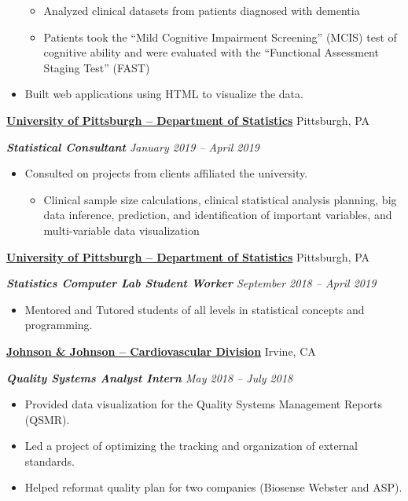 \documentclass[9pt,letterpaper]{article}
\begin{document}
\begin{description}[noitemsep]
\begin{itemize}[noitemsep]
\begin{itemize}
				\item Analyzed clinical datasets from patients diagnosed with dementia
				\item Patients took the ``Mild Cognitive Impairment Screening'' (MCIS) test of cognitive ability and were evaluated with the ``Functional Assessment Staging Test'' (FAST)
			\end{itemize}
			\item Built web applications using HTML to visualize the data.
		\end{itemize}
		\item \textbf{\ul{University of Pittsburgh -- Department of Statistics}} \hfill Pittsburgh, PA
		\item {\textit{\textbf{Statistical Consultant} \hfill January 2019 -- April 2019}}
		\begin{itemize}[noitemsep]
			\item Consulted on projects from clients affiliated the university.
			\begin{itemize}
				\item Clinical sample size calculations, clinical statistical analysis planning, big data inference, prediction, and identification of important variables, and multi-variable data visualization
			\end{itemize}
		\end{itemize}
		\item \textbf{\ul{University of Pittsburgh -- Department of Statistics}} \hfill Pittsburgh, PA
		\item {\textit{\textbf{Statistics Computer Lab Student Worker} \hfill September 2018 -- April 2019}}
		\begin{itemize}[noitemsep]
			\item Mentored and Tutored students of all levels in statistical concepts and programming.
		\end{itemize}
		\item \textbf{\ul{Johnson \& Johnson -- Cardiovascular Division}} \hfill Irvine, CA
		\item \textit{\textbf{Quality Systems Analyst Intern} \hfill May 2018 -- July 2018}
		\begin{itemize}[noitemsep]
			\item Provided data visualization for the Quality Systems Management Reports (QSMR).
			\item Led a project of optimizing the tracking and organization of external standards.
			\item Helped reformat quality plan for two companies (Biosense Webster and ASP).

\end{itemize}
\end{description}
\end{document}
